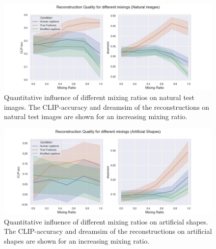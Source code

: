 \begin{figure}[H]
   \centering
   \includegraphics[width=1\textwidth]{plots/aicap_reconstruction_quant_evolution_test.JPEG}
   \caption[Quantitative influence of different mixing ratios on natural test images]{Quantitative influence of different mixing ratios on natural test images. The CLIP-accuracy and dreamsim of the reconstructions on natural test images are shown for an increasing mixing ratio.}\label{fig:aicap_reconstruction_quant_evolution_test}
\end{figure}

\begin{figure}[H]
   \centering
   \includegraphics[width=1\textwidth]{plots/aicap_reconstruction_quant_evolution_art.JPEG}
   \caption[Quantitative influence of different mixing ratios on artificial shapes]{Quantitative influence of different mixing ratios on artificial shapes. The CLIP-accuracy and dreamsim of the reconstructions on artificial shapes are shown for an increasing mixing ratio.}\label{fig:aicap_reconstruction_quant_evolution_art}
\end{figure}

